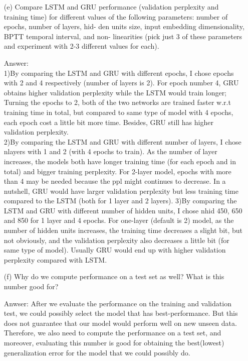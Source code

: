 \documentclass[12pt,letterpaper]{article}
\begin{document}
\begin{itemize}
    \item[(e)]Compare LSTM and GRU performance (validation perplexity and training time) for different values of the following parameters: number of epochs, number of layers, hid- den units size, input embedding dimensionality, BPTT temporal interval, and non- linearities (pick just 3 of these parameters and experiment with 2-3 different values for each).
    
    Answer: \\
    1)By comparing the LSTM and GRU with different epochs, I chose epochs with 2 and 4 respectively (number of layers is 2). For epoch number 4, GRU obtains higher validation perplexity while the LSTM would train longer; Turning the epochs to 2, both of the two networks are trained faster w.r.t training time in total, but compared to same type of model with 4 epochs, each epoch cost a little bit more time. Besides, GRU still has higher validation perplexity.\\
    2)By comparing the LSTM and GRU with different number of layers, I chose nlayers with 1 and 2 (with 4 epochs to train). As the number of layer increases, the models both have longer training time (for each epoch and in total) and bigger training perplexity. For 2-layer model, epochs with more than 4 may be needed because the ppl might continues to decrease. In a nutshell, GRU would have larger validation perplexity but less training time compared to the LSTM (both for 1 layer and 2 layers).
    3)By comparing the LSTM and GRU with different number of hidden units, I chose nhid 450, 650 and 850 for 1 layer and 4 epochs. For one-layer (default is 2) model, as the number of hidden units increases, the training time decreases a slight bit, but not obviously, and the validation perplexity also decreases a little bit (for same type of model). Usually GRU would end up with higher validation perplexity compared with LSTM.
    
    \item[(f)]Why do we compute performance on a test set as well? What is this number good for?
    
    Anwser: After we evaluate the performance on the training and validation test, we could possibly select the model that has best-performance. But this does not guarantee that our model would perform well on new unseen data. Therefore, we also need to compute the performance on a test set, and moreover, evaluating this number is good for obtaining the best(lowest) generalization error for the model that we could possibly do.
\end{itemize}
\end{document}

